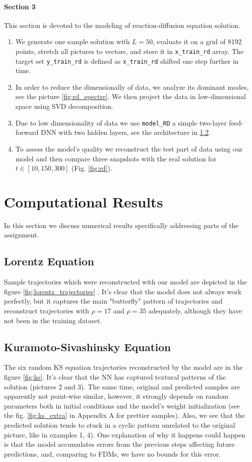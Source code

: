 \documentclass{article}
\begin{document}
\paragraph{Section 3} This section is devoted to the modeling of reaction-diffusion equation solution. 
    \begin{enumerate}
        \item[1)] We generate one sample solution with $L=50$, evaluate it on a grid of 8192 points, stretch all pictures to vectors, and store it in \texttt{x\_train\_rd} array. The target set \texttt{y\_train\_rd} is defined as \texttt{x\_train\_rd} shifted one step further in time. 
        \item[2)] In order to reduce the dimensionally of data, we analyze its dominant modes, see the picture \ref{fig:rd_spectre}. We then project the data in low-dimensional space using SVD decomposition.
        \item[3)] Due to low dimensionality of data we use \texttt{model\_RD} a simple two-layer feed-forward DNN with two hidden layers, see the architecture in \ref{}.
        \item[4)] To assess the model's quality we reconstruct the test part of data using our model and then compare three snapshots with the real solution for $t \in [10, 150, 300]$ (Fig. \ref{fig:rd}).  
    \end{enumerate}

\section{Computational Results}
    In this section we discuss numerical results specifically addressing parts of the assignment.
    \subsection{Lorentz Equation} Sample trajectories which were reconstructed with our model are depicted in the figure \ref{fig:lorentz_trajectories} . It's clear that the model does not always work perfectly, but it captures the main "butterfly" pattern of trajectories and reconstruct trajectories with $\rho = 17$ and $\rho = 35$ adequately, although they have not been in the training dataset. 
    \subsection{Kuramoto-Sivashinsky Equation} The six random KS equation trajectories reconstructed by the model are in the figure \ref{fig:ks}. It's clear that the NN has captured  textural patterns of the solution (pictures 2 and 3). The same time, original and predicted samples are apparently not point-wise similar, however, it strongly depends on  random parameters both in initial conditions and the model's weight initialization (see the fig. \ref{fig:ks_extra} in Appendix A for prettier samples). Also, we see that the predicted solution tends to stuck in a cyclic pattern unrelated to the original picture, like in examples 1, 4). One explanation of why it happens could happen is that the model accumulates errors from the previous steps affecting future predictions, and, comparing to FDMs, we have no bounds for this error. 
\end{document}
